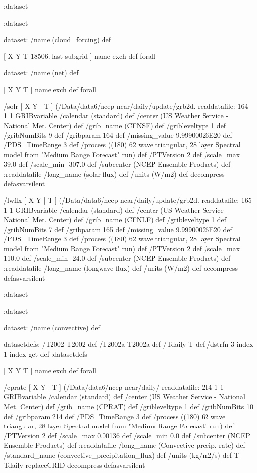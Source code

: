 \begin{ingrid}
   :dataset

  :dataset

  dataset: /name (cloud_forcing) def

   [ X Y T 18506. last subgrid ] { name exch def } forall
   
   dataset: /name (net) def

    [ X Y T ] { name exch def } forall

    /solr { [ X Y | T ] (/Data/data6/ncep-ncar/daily/update/grb2d.%
    readdatafile:
    164 1 1 GRIBvariable
    /calendar (standard) def
    /center (US Weather Service - National Met. Center) def
    /grib_name (CFNSF) def
    /gribleveltype 1 def
    /gribNumBits 9 def
    /gribparam 164 def
    /missing_value 9.99900026E20 def 
    /PDS_TimeRange 3 def
    /process ((180) 62 wave triangular, 28 layer Spectral model from "Medium Range Forecast" run) def
    /PTVersion 2 def
    /scale_max 39.0 def
    /scale_min -307.0 def
    /subcenter (NCEP Ensemble Products) def
    :readdatafile
    /long_name (solar flux) def
    /units (W/m2) def
    decompress
    } defasvarsilent
    
    /lwflx { [ X Y | T ] (/Data/data6/ncep-ncar/daily/update/grb2d.%
    readdatafile:
    165 1 1 GRIBvariable
    /calendar (standard) def
    /center (US Weather Service - National Met. Center) def
    /grib_name (CFNLF) def
    /gribleveltype 1 def
    /gribNumBits 7 def
    /gribparam 165 def
    /missing_value 9.99900026E20 def 
    /PDS_TimeRange 3 def
    /process ((180) 62 wave triangular, 28 layer Spectral model from "Medium Range Forecast" run) def
    /PTVersion 2 def
    /scale_max 110.0 def
    /scale_min -24.0 def
    /subcenter (NCEP Ensemble Products) def
    :readdatafile
    /long_name (longwave flux) def
    /units (W/m2) def
    decompress
    } defasvarsilent

   :dataset

  :dataset

  dataset: /name (convective) def

   datasetdefs:
   /T2002 T2002 def
   /T2002a T2002a def
   /Tdaily T def
   /dstrfn 3 index 1 index get def
   :datasetdefs

   [ X Y T ] { name exch def } forall

   /cprate { [ X Y | T ] (/Data/data6/ncep-ncar/daily/%
   readdatafile:
   214 1 1 GRIBvariable
   /calendar (standard) def
   /center (US Weather Service - National Met. Center) def
   /grib_name (CPRAT) def
   /gribleveltype 1 def
   /gribNumBits 10 def
   /gribparam 214 def
   /PDS_TimeRange 3 def
   /process ((180) 62 wave triangular, 28 layer Spectral model from "Medium Range Forecast" run) def
   /PTVersion 2 def
   /scale_max 0.00136 def
   /scale_min 0.0 def
   /subcenter (NCEP Ensemble Products) def
   :readdatafile
   /long_name (Convective precip. rate) def
   /standard_name (convective_precipitation_flux) def
   /units (kg/m2/s) def
   T Tdaily replaceGRID
   decompress
   } defasvarsilent


\end{ingrid}
